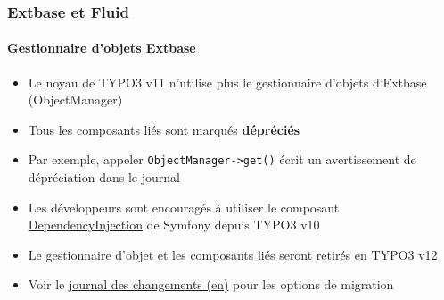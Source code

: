 %

\begin{frame}[fragile]
	\frametitle{Extbase et Fluid}
	\framesubtitle{Gestionnaire d'objets Extbase}


	\begin{itemize}
		\item Le noyau de TYPO3 v11 n'utilise plus le gestionnaire d'objets d'Extbase (ObjectManager)
		\item Tous les composants liés sont marqués \textbf{dépréciés}
		\item Par exemple, appeler \texttt{ObjectManager->get()} écrit un avertissement
			de dépréciation dans le journal
		\item Les développeurs sont encouragés à utiliser le composant
			\href{https://docs.typo3.org/m/typo3/reference-coreapi/master/en-us/ApiOverview/DependencyInjection/Index.html}{DependencyInjection}
			de Symfony depuis TYPO3 v10
		\item Le gestionnaire d'objet et les composants liés seront retirés en TYPO3 v12
		\item Voir le
			\href{https://docs.typo3.org/c/typo3/cms-core/master/en-us/Changelog/10.4/Deprecation-90803-DeprecationOfObjectManagergetInExtbaseContext.html#changelog-deprecation-90803-objectmanagerget}{journal des changements (en)}
			pour les options de migration
	\end{itemize}

\end{frame}

